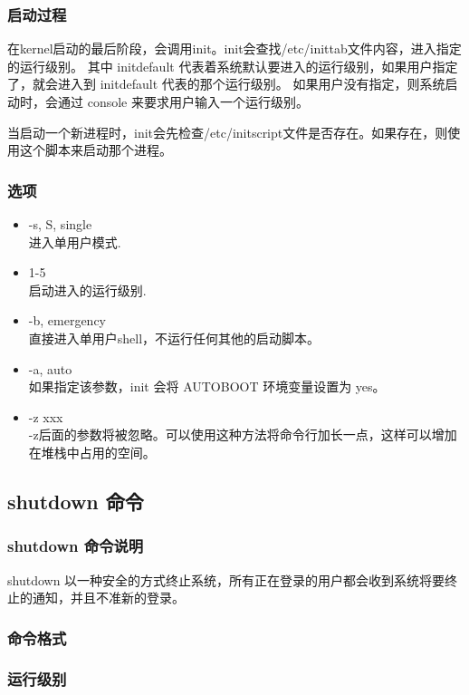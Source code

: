 \subsubsection{启动过程}

在kernel启动的最后阶段，会调用init。init会查找/etc/inittab文件内容，进入指定的运行级别。
其中 initdefault
代表着系统默认要进入的运行级别，如果用户指定了，就会进入到 initdefault
代表的那个运行级别。 如果用户没有指定，则系统启动时，会通过 console
来要求用户输入一个运行级别。

当启动一个新进程时，init会先检查/etc/initscript文件是否存在。如果存在，则使用这个脚本来启动那个进程。

\subsubsection{选项}

\begin{itemize}
\item
  -s, S, single\\ 进入单用户模式.
\item
  1-5\\ 启动进入的运行级别.
\item
  -b, emergency\\ 直接进入单用户shell，不运行任何其他的启动脚本。
\item
  -a, auto\\ 如果指定该参数，init 会将 AUTOBOOT 环境变量设置为 yes。
\item
  -z xxx\\
  -z后面的参数将被忽略。可以使用这种方法将命令行加长一点，这样可以增加在堆栈中占用的空间。
\end{itemize}
\subsection{shutdown 命令}

\subsubsection{shutdown 命令说明}

shutdown
以一种安全的方式终止系统，所有正在登录的用户都会收到系统将要终止的通知，并且不准新的登录。

\subsubsection{命令格式}

\subsubsection{运行级别}

